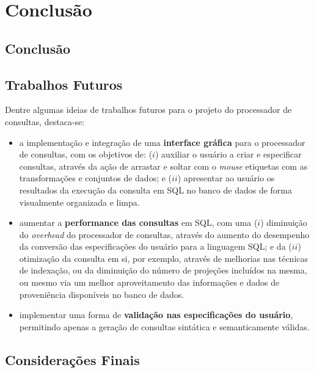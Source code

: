 
\chapter{Conclusão}%
\label{chap:conclusao}

\section{Conclusão}

\section{Trabalhos Futuros}

Dentre algumas ideias de trabalhos futuros para o projeto do processador de consultas, destaca-se:

\begin{itemize}
    \item a implementação e integração de uma \textbf{interface gráfica} para o processador de consultas, com os objetivos de: (\(i\)) auxiliar o usuário a criar e especificar consultas, através da ação de arrastar e soltar com o \textit{mouse} etiquetas com as transformações e conjuntos de dados; e (\(ii\)) apresentar ao usuário os resultados da execução da consulta em SQL no banco de dados de forma visualmente organizada e limpa.
    \item aumentar a \textbf{performance das consultas} em SQL, com uma (\(i\)) diminuição do \textit{overhead} do processador de consultas, através do aumento do desempenho da conversão das especificações do usuário para a linguagem SQL; e da (\(ii\)) otimização da consulta em si, por exemplo, através de melhorias nas técnicas de indexação, ou da diminuição do número de projeções incluídos na mesma, ou mesmo via um melhor aproveitamento das informações e dados de proveniência disponíveis no banco de dados.
    \item implementar uma forma de \textbf{validação nas especificações do usuário}, permitindo apenas a geração de consultas sintática e semanticamente válidas.
\end{itemize}


\section{Considerações Finais}


